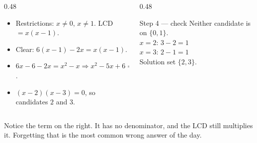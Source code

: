\documentclass[aspectratio=169, 11pt]{beamer}
\begin{document}
\begin{frame}[t, plain]
  \begin{columns}[T]
    \begin{column}{0.48\textwidth}
      \begin{itemize}\setlength{\itemsep}{4pt}
        \item Restrictions: $x\neq0$, $x\neq1$. \; LCD $=x(x-1)$.
        \item Clear: $6(x-1)-2x=x(x-1)$.
        \item $6x-6-2x=x^2-x \Rightarrow x^2-5x+6=0$.
        \item $(x-2)(x-3)=0$, so candidates $2$ and $3$.
      \end{itemize}
    \end{column}
    \begin{column}{0.48\textwidth}
      \begin{block}{Step 4 --- check}
        Neither candidate is on $\{0,1\}$. \\[4pt]
        $x=2$: \; $3-2=1$ \;\checkmark \\[2pt]
        $x=3$: \; $2-1=1$ \;\checkmark \\[4pt]
        \centering Solution set $\{2,3\}$.
      \end{block}
    \end{column}
  \end{columns}
  \vspace{6pt}
  {\footnotesize Notice the term on the right. It has no denominator, and the LCD still multiplies it.
  Forgetting that is the most common wrong answer of the day.}
\end{frame}
\end{document}
